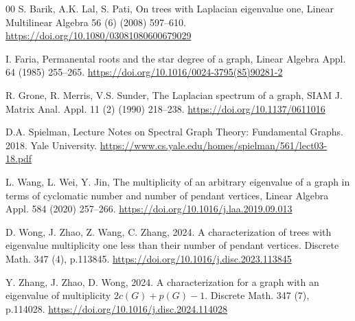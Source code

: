 \documentclass[preprint,12pt]{elsarticle}
\newcommand{\1}{\mathbf{1}}
\newcommand{\0}{\mathbf{0}}
\begin{document}
\begin{thebibliography}{00}
S. Barik, A.K. Lal, S. Pati, On trees with Laplacian eigenvalue one, Linear Multilinear Algebra
56 (6) (2008) 597--610. \href{https://doi.org/10.1080/03081080600679029}{https://doi.org/10.1080/03081080600679029}

I. Faria, Permanental roots and the star degree of a graph, Linear Algebra Appl. 64 (1985) 255--265. \href{https://doi.org/10.1016/0024-3795(85)90281-2}{https://doi.org/10.1016/0024-3795(85)90281-2}

R. Grone, R. Merris, V.S. Sunder, The Laplacian spectrum of a graph, SIAM J. Matrix Anal. Appl.
11 (2) (1990) 218--238. \href{https://doi.org/10.1137/0611016}{https://doi.org/10.1137/0611016}

D.A. Spielman, Lecture Notes on Spectral Graph Theory: Fundamental Graphs. 2018. Yale University. \href{https://www.cs.yale.edu/homes/spielman/561/lect03-18.pdf}{https://www.cs.yale.edu/homes/spielman/561/lect03-18.pdf}

L. Wang, L. Wei, Y. Jin, The multiplicity of an arbitrary eigenvalue of a graph in terms of cyclomatic number and number of pendant vertices, Linear Algebra Appl. 584 (2020) 257--266. \href{https://doi.org/10.1016/j.laa.2019.09.013}{https://doi.org/10.1016/j.laa.2019.09.013} 

D. Wong, J. Zhao, Z. Wang, C. Zhang, 2024. A characterization of trees with eigenvalue multiplicity one less than their number of pendant vertices. Discrete Math. 347 (4), p.113845. \href{https://doi.org/10.1016/j.disc.2023.113845}{https://doi.org/10.1016/j.disc.2023.113845}


Y. Zhang, J. Zhao, D. Wong, 2024. A characterization for a graph with an eigenvalue of multiplicity $2c (G)+ p (G)-1$. Discrete Math. 347 (7), p.114028. \href{https://doi.org/10.1016/j.disc.2024.114028}{https://doi.org/10.1016/j.disc.2024.114028}









\end{thebibliography}
\end{document}
